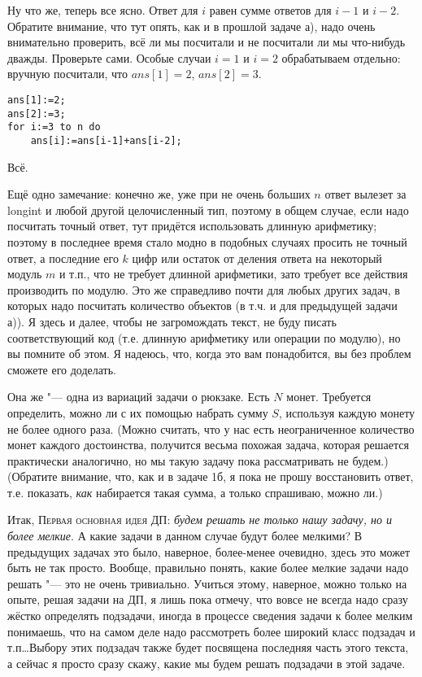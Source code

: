 Ну что же, теперь все ясно. Ответ для $i$ равен сумме ответов для $i-1$ и $i-2$. {\footnotesize 
Обратите внимание, что тут опять, как и в прошлой задаче а), надо очень внимательно проверить, всё 
ли мы посчитали и не посчитали ли мы что-нибудь дважды. Проверьте сами.} Особые случаи $i=1$ и $i=2$ 
обрабатываем отдельно: вручную посчитали, что $ans[1]=2$, $ans[2]=3$.
\begin{codesampleo}\begin{verbatim}
ans[1]:=2;
ans[2]:=3;
for i:=3 to n do
    ans[i]:=ans[i-1]+ans[i-2];
\end{verbatim}\end{codesampleo}
Всё.

Ещё одно замечание: конечно же, уже при не очень больших $n$ ответ вылезет за longint и любой 
другой целочисленный тип, поэтому в общем случае, если надо посчитать точный ответ, тут придётся 
использовать длинную арифметику; поэтому в последнее время стало 
модно в подобных случаях просить не точный ответ, а последние его $k$ цифр или остаток от деления 
ответа на некоторый модуль $m$ и т.п., что не требует длинной арифметики, зато требует все действия 
производить по модулю. Это же справедливо почти для любых других задач, в которых надо 
посчитать количество объектов (в т.ч. и для предыдущей задачи а)). Я здесь и далее, чтобы не 
загромождать текст, не буду писать соответствующий код (т.е. длинную арифметику или операции по модулю), 
но вы помните об этом. Я надеюсь, что, когда это вам понадобится, вы без проблем сможете его 
доделать.

\label{coins}
Она же "--- одна из вариаций задачи о 
рюкзаке. Есть $N$ монет. Требуется определить, можно ли с их помощью набрать сумму $S$, используя 
каждую монету не более одного раза.  (Можно считать, что у нас есть неограниченное количество монет 
каждого достоинства, получится весьма похожая задача, которая решается практически аналогично, но 
мы такую задачу пока рассматривать не будем.) (Обратите внимание, что, как и в задаче 1б, я пока не 
прошу восстановить ответ, т.е. показать, \textit{как} набирается такая сумма, а только спрашиваю, 
можно ли.)

Итак, \textsc{Первая основная идея ДП:} \textit{будем решать не только нашу задачу, но и более мелкие}. А 
какие задачи в данном случае будут более мелкими? В предыдущих задачах это было, наверное, 
более-менее очевидно, здесь это может быть не так просто. Вообще, правильно 
понять, какие более мелкие задачи надо решать "--- это не очень тривиально. Учиться этому, 
наверное, можно только на опыте, решая задачи на ДП, я лишь пока отмечу, что вовсе не всегда надо 
сразу жёстко определять подзадачи, иногда в процессе сведения задачи к более мелким понимаешь, что 
на самом деле надо рассмотреть более широкий класс подзадач и т.п\dots Выбору этих подзадач также 
будет посвящена последняя часть этого текста, а сейчас я просто сразу скажу, какие мы будем решать 
подзадачи в этой задаче.

